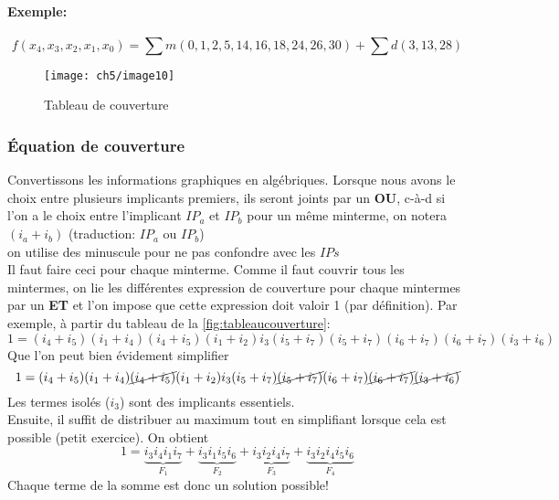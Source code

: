 \paragraph{Exemple:}
\begin{equation*}
	f(x_4,x_3,x_2,x_1,x_0)=\sum m(0,1,2,5,14,16,18,24,26,30)+\sum d(3,13,28)
\end{equation*}
\begin{figure}[H]
	\hspace{-1.5cm}
	\texttt{[image: ch5/image10]}
	\caption{Tableau de couverture}
	\label{fig:tableaucouverture}
\end{figure}
\subsubsection{Équation de couverture}
Convertissons les informations graphiques en algébriques. Lorsque nous avons le choix entre plusieurs implicants premiers, ils seront joints par un \textbf{OU}, c-à-d si l'on a le choix entre l'implicant $IP_a$ et $IP_b$ pour un même minterme, on notera $(i_a+i_b)$ (traduction: $IP_a$ ou $IP_b$)\\
\danger on utilise des minuscule pour ne pas confondre avec les $IPs$\\

Il faut faire ceci pour chaque minterme. Comme il faut couvrir tous les mintermes, on lie les différentes expression de couverture pour chaque mintermes par un \textbf{ET} et l'on impose que cette expression doit valoir 1 (par définition). Par exemple, à partir du tableau de la \autoref{fig:tableaucouverture}:
\begin{equation}
	1=(i_4+i_5)(i_1 +i_4)(i_4+i_5)(i_1+i_2)i_3(i_5+i_7)(i_5+i_7)(i_6+i_7)(i_6+i_7)(i_3+i_6)
\end{equation}
Que l'on peut bien évidement simplifier
\begin{equation}
	1=(i_4+i_5)(i_1 +i_4)\cancel{(i_4+i_5)}(i_1+i_2)i_3(i_5+i_7)\cancel{(i_5+i_7)}(i_6+i_7)\cancel{(i_6+i_7)}\cancel{(i_3+i_6)}
\end{equation}
Les termes isolés ($i_3$) sont des implicants essentiels.\\
Ensuite, il suffit de distribuer au maximum tout en simplifiant lorsque cela est possible (petit exercice). On obtient
\begin{equation}
	1=\underbrace{i_3i_4i_1i_7}_{F_1}+\underbrace{i_3i_1i_5i_6}_{F_2}+\underbrace{i_3i_2i_4i_7}_{F_3}+\underbrace{i_3i_2i_4i_5i_6}_{F_4}
\end{equation}
Chaque terme de la somme est donc un solution possible!\\

